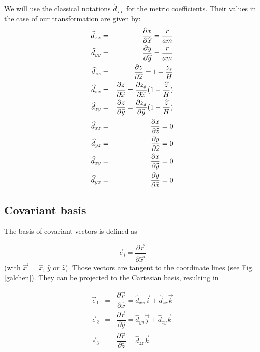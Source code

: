 We will use the classical notations $\widehat{d}_{\star \star}$
for the metric coefficients. Their values in the case of our transformation
are given by:
\begin{eqnarray}
\widehat{d}_{xx} & = & \dfrac{\partial x}{\partial \widehat{x} }
         = { r \over a m } \nonumber\\
\widehat{d}_{yy} & = & \dfrac{\partial y}{\partial \widehat{y} }
         = { r \over a m } \nonumber\\
\widehat{d}_{zz} & = & \dfrac{\partial z}{\partial \widehat{z} }
         =  1 - {z_s \over H} \nonumber \\
\widehat{d}_{zx} & = & \dfrac{\partial z}{\partial \widehat{x} }
         = {\partial z_s \over \partial \widehat{x} }(1-{\widehat{z}\over H})
\nonumber\\
\widehat{d}_{zy} & = & \dfrac{\partial z}{\partial \widehat{y} }
         = {\partial z_s \over \partial \widehat{y} }(1-{\widehat{z}\over H})
\\
\widehat{d}_{xz} & = & \dfrac{\partial x}{\partial \widehat{z} } = 0 \nonumber \\
\widehat{d}_{yz} & = & \dfrac{\partial y}{\partial \widehat{z} } = 0 \nonumber \\
\widehat{d}_{xy} & = & \dfrac{\partial x}{\partial \widehat{y} } = 0 \nonumber \\
\widehat{d}_{yx} & = & \dfrac{\partial y}{\partial \widehat{x} } = 0 \nonumber
\end{eqnarray}

\subsection{Covariant basis}

The basis of covariant vectors is defined as

\begin{equation}
\vec{e}_{i} = \dfrac{\partial \vec{r}}{\partial \widehat{x}^{i}}
\end{equation}
(with $\widehat{x}^{i}=\widehat{x}$, $\widehat{y}$ or $\widehat{z}$).
Those vectors are tangent to the coordinate lines (see Fig. \ref{galchen}).
They can be projected to the Cartesian basis, resulting in

\begin{eqnarray}
\vec{e}_{1} & = & \dfrac{\partial \vec{r}}{\partial \widehat{x}} =
\widehat{d}_{xx} \vec{i} + \widehat{d}_{zx} \vec{k} \nonumber \\
\vec{e}_{2} & = & \dfrac{\partial \vec{r}}{\partial \widehat{y}} =
\widehat{d}_{yy} \vec{j} + \widehat{d}_{zy} \vec{k} \nonumber \\
\vec{e}_{3} & = & \dfrac{\partial \vec{r}}{\partial \widehat{z}} =
\widehat{d}_{zz}\vec{k}
\end{eqnarray}

